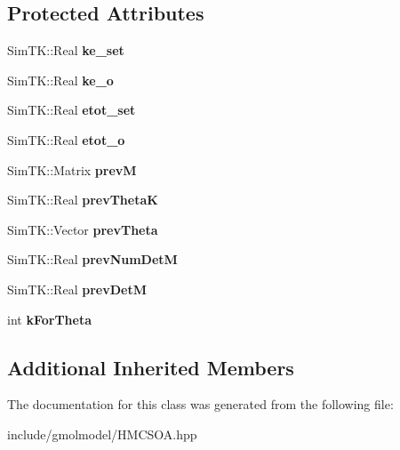 \subsection*{Protected Attributes}
\begin{DoxyCompactItemize}
\item 
Sim\+T\+K\+::\+Real {\bfseries ke\+\_\+set}\hypertarget{classTestHMCSOA_ab56809ea1f775e1b8e991d7a4db75b01}{}\label{classTestHMCSOA_ab56809ea1f775e1b8e991d7a4db75b01}

\item 
Sim\+T\+K\+::\+Real {\bfseries ke\+\_\+o}\hypertarget{classTestHMCSOA_a79b035979c103f97106f783924e963fa}{}\label{classTestHMCSOA_a79b035979c103f97106f783924e963fa}

\item 
Sim\+T\+K\+::\+Real {\bfseries etot\+\_\+set}\hypertarget{classTestHMCSOA_af04aa9201e9d3348f49bca5ddca734aa}{}\label{classTestHMCSOA_af04aa9201e9d3348f49bca5ddca734aa}

\item 
Sim\+T\+K\+::\+Real {\bfseries etot\+\_\+o}\hypertarget{classTestHMCSOA_a462dc02f4d80fe31eabbfbca0fd55946}{}\label{classTestHMCSOA_a462dc02f4d80fe31eabbfbca0fd55946}

\item 
Sim\+T\+K\+::\+Matrix {\bfseries prevM}\hypertarget{classTestHMCSOA_ae613b56cea287b2870a10034e0a5e664}{}\label{classTestHMCSOA_ae613b56cea287b2870a10034e0a5e664}

\item 
Sim\+T\+K\+::\+Real {\bfseries prev\+ThetaK}\hypertarget{classTestHMCSOA_ad3965ebb4116c89d3d43028b01322457}{}\label{classTestHMCSOA_ad3965ebb4116c89d3d43028b01322457}

\item 
Sim\+T\+K\+::\+Vector {\bfseries prev\+Theta}\hypertarget{classTestHMCSOA_acb6e5013a74bff45786d95f7ef00577b}{}\label{classTestHMCSOA_acb6e5013a74bff45786d95f7ef00577b}

\item 
Sim\+T\+K\+::\+Real {\bfseries prev\+Num\+DetM}\hypertarget{classTestHMCSOA_a87e8659d888b41db0d8e691003589682}{}\label{classTestHMCSOA_a87e8659d888b41db0d8e691003589682}

\item 
Sim\+T\+K\+::\+Real {\bfseries prev\+DetM}\hypertarget{classTestHMCSOA_a95ff59a5df94532f76bc4e2f0c61cf24}{}\label{classTestHMCSOA_a95ff59a5df94532f76bc4e2f0c61cf24}

\item 
int {\bfseries k\+For\+Theta}\hypertarget{classTestHMCSOA_ae0e68a6cc0093afcb198de88730a2200}{}\label{classTestHMCSOA_ae0e68a6cc0093afcb198de88730a2200}

\end{DoxyCompactItemize}
\subsection*{Additional Inherited Members}


The documentation for this class was generated from the following file\+:\begin{DoxyCompactItemize}
\item 
include/gmolmodel/H\+M\+C\+S\+O\+A.\+hpp\end{DoxyCompactItemize}
